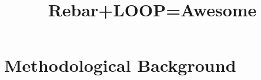 \documentclass[12pt]{article}
\title{Rebar+LOOP=Awesome}
\begin{document}
\maketitle
\section{Methodological Background}









\end{document}
